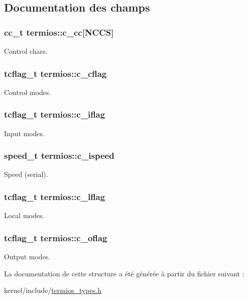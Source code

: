 \subsection{\-Documentation des champs}
\hypertarget{structtermios_a5fbe3e4316082afab45fc424938ef13a}{
\subsubsection[{c\-\_\-cc}]{\setlength{\rightskip}{0pt plus 5cm}cc\-\_\-t {\bf termios\-::c\-\_\-cc}\mbox{[}\-N\-C\-C\-S\mbox{]}}}\label{structtermios_a5fbe3e4316082afab45fc424938ef13a}
\-Control chars. \hypertarget{structtermios_a5d42b95faa4745c3bea53652d2812162}{
\subsubsection[{c\-\_\-cflag}]{\setlength{\rightskip}{0pt plus 5cm}tcflag\-\_\-t {\bf termios\-::c\-\_\-cflag}}}\label{structtermios_a5d42b95faa4745c3bea53652d2812162}
\-Control modes. \hypertarget{structtermios_a85b6c86d2a3db45a3829488190e357e4}{
\subsubsection[{c\-\_\-iflag}]{\setlength{\rightskip}{0pt plus 5cm}tcflag\-\_\-t {\bf termios\-::c\-\_\-iflag}}}\label{structtermios_a85b6c86d2a3db45a3829488190e357e4}
\-Input modes. \hypertarget{structtermios_a02ae972cbc9fb2cf4a1aa6a6751a421a}{
\subsubsection[{c\-\_\-ispeed}]{\setlength{\rightskip}{0pt plus 5cm}speed\-\_\-t {\bf termios\-::c\-\_\-ispeed}}}\label{structtermios_a02ae972cbc9fb2cf4a1aa6a6751a421a}
\-Speed (serial). \hypertarget{structtermios_a91bdd7691180800fccc4b791466ee9c3}{
\subsubsection[{c\-\_\-lflag}]{\setlength{\rightskip}{0pt plus 5cm}tcflag\-\_\-t {\bf termios\-::c\-\_\-lflag}}}\label{structtermios_a91bdd7691180800fccc4b791466ee9c3}
\-Local modes. \hypertarget{structtermios_ad6e2cfedb81530e5a6a3a0e30b8c6362}{
\subsubsection[{c\-\_\-oflag}]{\setlength{\rightskip}{0pt plus 5cm}tcflag\-\_\-t {\bf termios\-::c\-\_\-oflag}}}\label{structtermios_ad6e2cfedb81530e5a6a3a0e30b8c6362}
\-Output modes. 

\-La documentation de cette structure a été générée à partir du fichier suivant \-:\begin{DoxyCompactItemize}
\item 
kernel/include/\hyperlink{termios__types_8h}{termios\-\_\-types.\-h}\end{DoxyCompactItemize}
